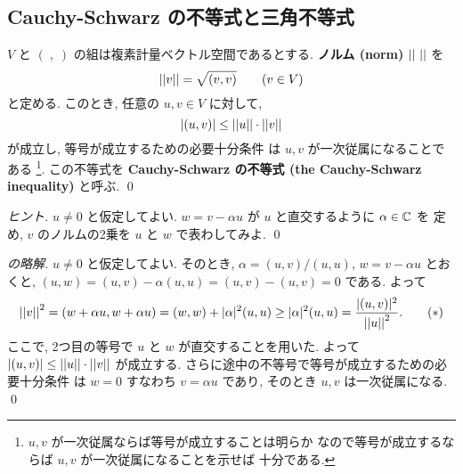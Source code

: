 \documentclass[12pt,twoside]{jarticle}
\newcommand\commentout[1]{#1}
\newcommand\commentout[1]{}
\begin{document}

\subsection{Cauchy-Schwarz の不等式と三角不等式}


\begin{question}
\label{q:Cauchy-Schwarz}
  $V$ と $(\;,\;)$ の組は複素計量ベクトル空間であるとする. 
  {\bf ノルム (norm)} $\left|\left|\ \right|\right|$ を
  \begin{equation*}
    \left|\left|v\right|\right| = \sqrt{(v,v)}
    \qquad (v\in V)
  \end{equation*}
  と定める. このとき, 任意の $u,v\in V$ に対して,
  \begin{equation*}
    |(u,v)| \le \left|\left|u\right|\right|\cdot\left|\left|v\right|\right|
  \end{equation*}
  が成立し, 等号が成立するための必要十分条件
  は $u,v$ が一次従属になることである%
  \footnote{$u,v$ が一次従属ならば等号が成立することは明らか
    なので等号が成立するならば $u,v$ が一次従属になることを示せば
    十分である.}.
  この不等式を {\bf Cauchy-Schwarz の不等式 (the Cauchy-Schwarz inequality)} 
  と呼ぶ. \qed
\end{question}

\begin{proof}[ヒント]
  $u\ne0$ と仮定してよい.
  $w=v-\alpha u$ が $u$ と直交するように $\alpha\in{\mathbb C}$ を
  定め, $v$ のノルムの2乗を $u$ と $w$ で表わしてみよ.
  \qed
\end{proof}

\commentout{
\begin{proof}[の略解]
  $u\ne 0$ と仮定してよい. 
  そのとき, $\alpha = (u,v)/(u,u)$, $w=v-\alpha u$ とおくと,
  $(u,w) = (u,v)-\alpha(u,u) = (u,v)-(u,v) = 0$ である. 
  よって
  \begin{equation*}
    \left|\left|v\right|\right|^2
    = (w+\alpha u, w+\alpha u)
    = (w, w) + |\alpha|^2 (u,u)
    \ge |\alpha|^2 (u,u)
    = \frac{|(u,v)|^2}{\left|\left|u\right|\right|^2}.
    \tag{$*$}
  \end{equation*}
  ここで, 2つ目の等号で $u$ と $w$ が直交することを用いた.
  よって $|(u,v)|\le \left|\left|u\right|\right|\cdot\left|\left|v\right|\right|$ が成立する.
  さらに途中の不等号で等号が成立するための必要十分条件
  は $w=0$ すなわち $v=\alpha u$ であり,
  そのとき $u,v$ は一次従属になる.  
  \qed
\end{proof}
}
\end{document}
